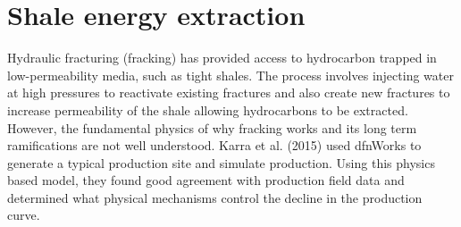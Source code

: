 \documentclass[letterpaper,10pt,english]{sphinxmanual}
\begin{document}
\begin{figure}[htbp]
\centering
\capstart

\noindent{}
\caption{}\label{\detokenize{applications:id1}}\end{figure}


\section{Shale energy extraction}
\label{\detokenize{applications:shale-energy-extraction}}
Hydraulic fracturing (fracking) has provided access to hydrocarbon trapped in low-permeability media, such as tight shales. The process involves injecting water at high pressures to reactivate existing fractures and also create new fractures to increase permeability of the shale allowing hydrocarbons to be extracted. However, the fundamental physics of why fracking works and its long term ramifications are not well understood. Karra et al. (2015) used dfnWorks to generate a typical production site and simulate production. Using this physics based model, they found good agreement with production field data and determined what physical mechanisms control the decline in the production curve.

\begin{figure}[htbp]
\centering
\capstart

\noindent{}
\caption{}\label{\detokenize{applications:id2}}\end{figure}
\end{document}
